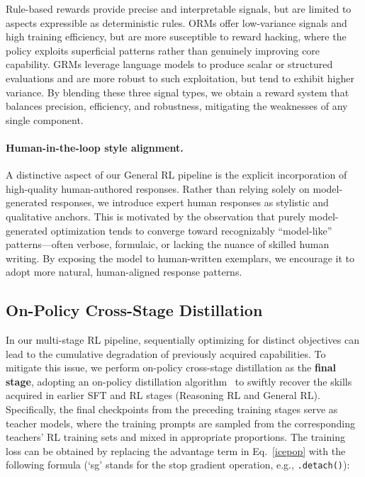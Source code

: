 \documentclass{article}
\theoremstyle{definition}
\begin{document}
Rule-based rewards provide precise and interpretable signals, but are limited to aspects expressible as deterministic rules. ORMs offer low-variance signals and high training efficiency, but are more susceptible to reward hacking, where the policy exploits superficial patterns rather than genuinely improving core capability. GRMs leverage language models to produce scalar or structured evaluations and are more robust to such exploitation, but tend to exhibit higher variance. By blending these three signal types, we obtain a reward system that balances precision, efficiency, and robustness, mitigating the weaknesses of any single component.

\paragraph{Human-in-the-loop style alignment.}
A distinctive aspect of our General RL pipeline is the explicit incorporation of high-quality human-authored responses. Rather than relying solely on model-generated responses, we introduce expert human responses as stylistic and qualitative anchors. This is motivated by the observation that purely model-generated optimization tends to converge toward recognizably ``model-like'' patterns---often verbose, formulaic, or lacking the nuance of skilled human writing. By exposing the model to human-written exemplars, we encourage it to adopt more natural, human-aligned response patterns.

\subsection{On-Policy Cross-Stage Distillation}
In our multi-stage RL pipeline, sequentially optimizing for distinct objectives can lead to the cumulative degradation of previously acquired capabilities. To mitigate this issue, we perform on-policy cross-stage distillation as the \textbf{final stage}, adopting an on-policy distillation algorithm~\cite{guminillm,qwen3,xiao2026mimov2flashtechnicalreport,lu2025onpolicydistillation} to swiftly recover the skills acquired in earlier SFT and RL stages (Reasoning RL and General RL). Specifically, the final checkpoints from the preceding training stages serve as teacher models, where the training prompts are sampled from the corresponding teachers' RL training sets and mixed in appropriate proportions. The training loss can be obtained by replacing the advantage term in Eq.~\ref{icepop} with the following formula (`sg' stands for the stop gradient operation, e.g., \texttt{.detach()}):
\end{document}

